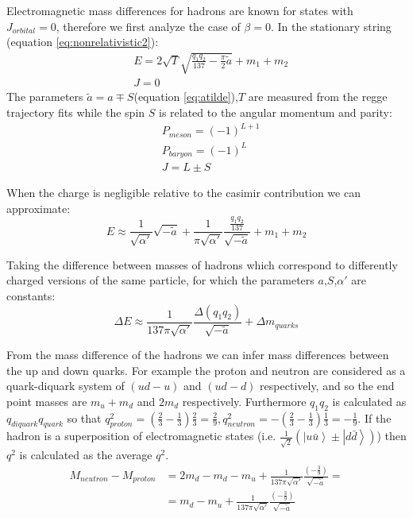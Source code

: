 \documentclass[11pt,a4paper]{article}
\begin{document}
Electromagnetic mass differences for hadrons are known for states with $J_{orbital}=0$, therefore we first analyze the case of $\beta=0$. In the stationary string (equation \ref{eq:nonrelativistic2}):
\begin{align}
&E=2\sqrt{T}\sqrt{\frac{q_1q_2}{137}-\frac{\pi}{2}\tilde{a}}+m_{1}+m_{2} \\
&J=0
\end{align}
The parameters $\tilde{a}=a\mp S$(equation \ref{eq:atilde}),$T$ are measured from the regge trajectory fits while the spin $S$ is related to the angular momentum and parity:
\begin{align*}
&P_{meson}=\left(-1\right)^{L+1}\\
&P_{baryon}=\left(-1\right)^{L}\\
&J=L\pm S
\end{align*}
 
When the charge is negligible relative to the casimir contribution we can approximate:
\begin{equation*}
E\approx\frac{1}{\sqrt{\alpha'}}\sqrt{-\tilde{a}}+\frac{1}{\pi\sqrt{\alpha'}}\frac{\frac{q_1q_2}{137}}{\sqrt{-\tilde{a}}}+m_1+m_2
\end{equation*}

Taking the difference between masses of hadrons which correspond to differently charged versions of the same particle, for which the parameters $a$,$S$,$\alpha'$ are constants:
\begin{equation*}
\Delta E\approx\frac{1}{137\pi\sqrt{\alpha'}}\frac{\Delta (q_1q_2)}{\sqrt{-\tilde{a}}}+\Delta m_{quarks}
\end{equation*}
 
From the mass difference of the hadrons we can infer mass differences between the up and down quarks. For example the proton and neutron are considered as a quark-diquark system of $\left(ud-u\right)$ and $\left(ud-d\right)$ respectively, and so the end point masses are $m_{u}+m_{d}$ and $2m_{d}$ respectively. Furthermore $q_1q_2$ is calculated as $q_{diquark}q_{quark}$ so that $q_{proton}^{2}=\left(\frac{2}{3}-\frac{1}{3}\right)\frac{2}{3}=\frac{2}{9}
, q_{neutron}^{2}=-\left(\frac{2}{3}-\frac{1}{3}\right)\frac{1}{3}=-\frac{1}{9}$. If the hadron is a superposition of electromagnetic states (i.e. $\frac{1}{\sqrt{2}}\left(\left|u\bar{u}\right\rangle \pm\left|d\bar{d}\right\rangle \right)$) then $q^{2}$ is calculated as the average $q^{2}$.
\begin{align*}
M_{neutron}-M_{proton}&=2m_{d}-m_{d}-m_{u}+\frac{1}{137\pi\sqrt{\alpha'}}\frac{\left(-\frac{3}{9}\right)}{\sqrt{-\tilde{a}}}=\\
&=m_{d}-m_{u}+\frac{1}{137\pi\sqrt{\alpha'}}\frac{\left(-\frac{3}{9}\right)}{\sqrt{-\tilde{a}}}
\end{align*}
\end{document}
